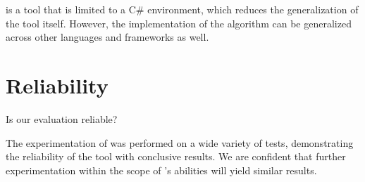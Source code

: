 \mytool is a tool that is limited to a C\# environment, which reduces the generalization of the tool itself. However, the implementation of the algorithm can be generalized across other languages and frameworks as well.


\section{Reliability}

Is our evaluation reliable?

The experimentation of \mytool was performed on a wide variety of tests, demonstrating the reliability of the tool with conclusive results. We are confident that further experimentation within the scope of \mytool's abilities will yield similar results.

